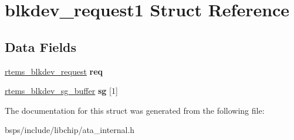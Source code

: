 \hypertarget{structblkdev__request1}{}\section{blkdev\+\_\+request1 Struct Reference}
\label{structblkdev__request1}
\subsection*{Data Fields}
\begin{DoxyCompactItemize}
\item 
\mbox{\label{structblkdev__request1_a5e29e6b751a5a5df6379196ed9395f8a}} 
\mbox{\hyperlink{structrtems__blkdev__request}{rtems\+\_\+blkdev\+\_\+request}} {\bfseries req}
\item 
\mbox{\label{structblkdev__request1_a30903106801cf51834c15eadf5b72f90}} 
\mbox{\hyperlink{structrtems__blkdev__sg__buffer}{rtems\+\_\+blkdev\+\_\+sg\+\_\+buffer}} {\bfseries sg} \mbox{[}1\mbox{]}
\end{DoxyCompactItemize}


The documentation for this struct was generated from the following file\+:\begin{DoxyCompactItemize}
\item 
bsps/include/libchip/ata\+\_\+internal.\+h\end{DoxyCompactItemize}
